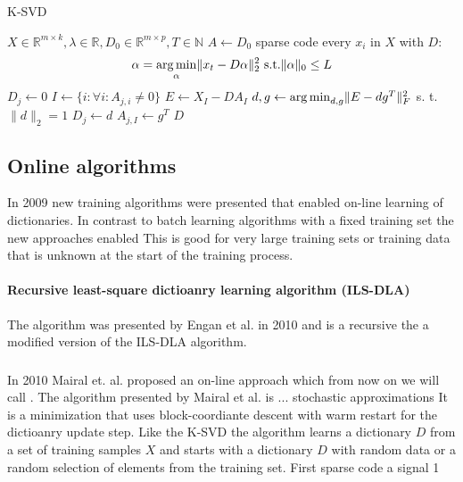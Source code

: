 \begin{algorithm}[H]
\caption{K-SVD}
\label{alg:k-svd}
\begin{algorithmic}[1]
\REQUIRE $X \in \mathbb{R}^{m \times k}, \lambda \in
\mathbb{R}, D_0 \in \mathbb{R}^{m \times p}, T \in \mathbb{N}$
\STATE $A \gets D_0$
\STATE sparse code every $x_i$ in $X$ with $D$:
\begin{equation}
\alpha = \operatorname*{arg\,min}_{\alpha}\lVert
x_t - D\alpha\rVert_2^2 \text{ s.t.} \lVert\alpha\rVert_0 \leq L
\end{equation}
\STATE $D_j \gets 0$
\STATE $I \gets \{ i : \forall i : A_{j,i} \neq 0 \}$
\STATE $E \gets X_I - DA_I$
\STATE $d,g \gets \operatorname*{arg\,min}_{d,g} \lVert E- dg^T \rVert_F^{2}$ s. t. $\lVert d
\rVert_{2} = 1$
\STATE $D_j \gets d$
\STATE $A_{j,I} \gets g^T$
\ENDFOR 
\ENDFOR
\RETURN $D$
\end{algorithmic}
\end{algorithm}

\subsection{Online algorithms}
In 2009 new training algorithms were presented that enabled on-line learning of
dictionaries. In contrast to batch learning algorithms with a fixed training set
the new approaches enabled This is good for very large training sets or training
data that is unknown at the start of the training process.

\paragraph{Recursive least-square dictioanry learning algorithm (ILS-DLA)}
The algorithm was presented by Engan et al. in 2010\cite{Engan2010} and is a
recursive the a modified version of the ILS-DLA algorithm.


\subsubsection{\trainDL}
\label{sec:mairal}
In 2010 Mairal et. al.\cite{Mairal2010} proposed an on-line approach which from
now on we will call \trainDL. The algorithm presented by Mairal et
al.\cite{Mairal2010} is ... 
stochastic approximations 
It is a minimization that uses block-coordiante descent with warm restart for
the dictioanry update step.
Like the K-SVD the algorithm learns a dictionary $D$ from a set of training
samples $X$ and starts with a dictionary $D$ with random data or a random
selection of elements from the training set. 
First sparse code a signal  1

